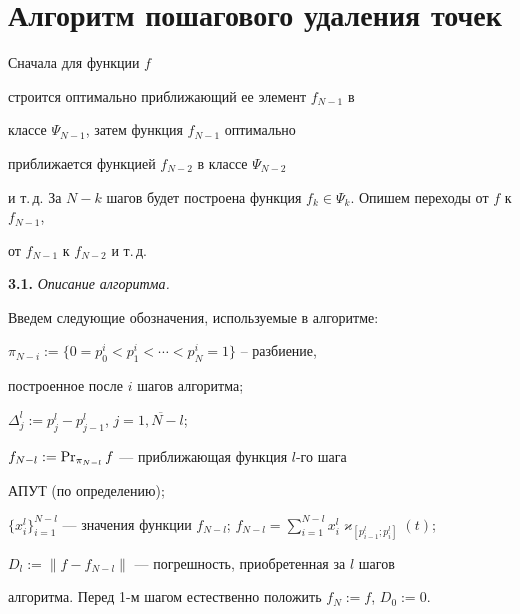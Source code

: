 \section{Алгоритм пошагового удаления точек}





Сначала для функции $f$


строится оптимально приближающий ее элемент $f_{N-1}$ в


классе $\Psi_{N-1}$, затем функция $f_{N-1}$ оптимально


приближается функцией $f_{N-2}$ в классе $\Psi_{N-2}$


и т.\,д. За $N-k$ шагов будет построена функция $f_k \in


\Psi_{k}$. Опишем переходы от $f$ к $f_{N-1}$,


от $f_{N-1}$ к $f_{N-2}$ и т.\,д.


\medskip





{\bf 3.1.} {\it Описание алгоритма.}


Введем следующие обозначения, используемые в алгоритме:





$\pi_{N-i}:=\{0=p_0^{ i}<p_1^{ i}<\dotsb<p_N^{ i}=1\}$ -- разбиение,


построенное после $i$ шагов алгоритма;





$\Delta_j^l:=p_j^l-p_{j-1}^l$, $j=\overline{1,N-l}$; 





$f_{N-l}:=\operatorname{Pr}_{\pi_{N-l}}f$ --- приближающая функция $l$-го шага


АПУТ (по определению);





$\{x_i^l\}_{i=1}^{N-l}$ --- значения функции $f_{N-l}$; $f_{N-l}


=\sum\limits_{i=1}^{N-l}x_i^l\varkappa_{[p_{i-1}^{l};p_i^{l}]}(t)$;





$D_l:=\|f-f_{N-l}\|$ --- погрешность, приобретенная за $l$ шагов


алгоритма. Перед 1-м шагом естественно положить $f_N:=f$, $D_0:=0$.





